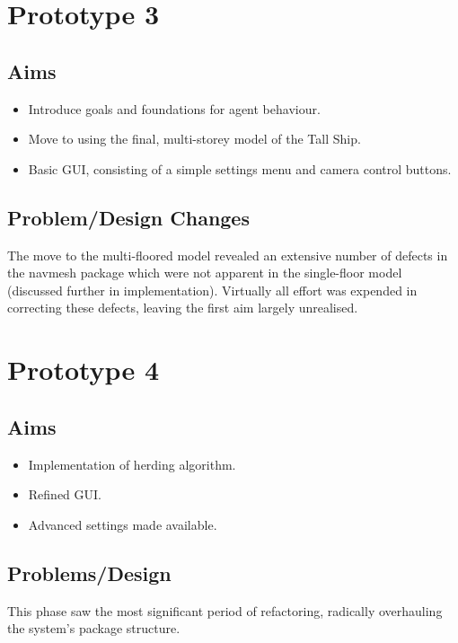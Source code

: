 \section{Prototype 3}
\subsection{Aims}
\begin{itemize}
\item{Introduce goals and foundations for agent behaviour.}
\item{Move to using the final, multi-storey model of the Tall Ship.}
\item{Basic GUI, consisting of a simple settings menu and camera control buttons.}
\end{itemize}
\subsection{Problem/Design Changes}
The move to the multi-floored model revealed an extensive number of defects in the navmesh package which were not apparent in the single-floor model (discussed further in implementation). Virtually all effort was expended in correcting these defects, leaving the first aim largely unrealised.

\section{Prototype 4}
\subsection{Aims}
\begin{itemize}
\item{Implementation of herding algorithm.}
\item{Refined GUI.}
\item{Advanced settings made available.}
\end{itemize}
\subsection{Problems/Design}
This phase saw the most significant period of refactoring, radically overhauling the system's package structure.

%













